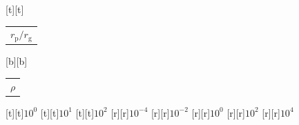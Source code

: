 %    
%
%
\begin{psfrags}%
\psfragscanon%
%
[t][t]{\color[rgb]{0,0,0}\setlength{\tabcolsep}{0pt}\begin{tabular}{c}{\Large$r_\mathrm{p}/r_\mathrm{g}$}\end{tabular}}%
[b][b]{\color[rgb]{0,0,0}\setlength{\tabcolsep}{0pt}\begin{tabular}{c}{\Large$\rho$}\end{tabular}}%
%
[t][t]{$10^{0}$}%
[t][t]{$10^{1}$}%
[t][t]{$10^{2}$}%
%
[r][r]{$10^{-4}$}%
[r][r]{$10^{-2}$}%
[r][r]{$10^{0}$}%
[r][r]{$10^{2}$}%
[r][r]{$10^{4}$}%
%
%
\end{psfrags}%
%
